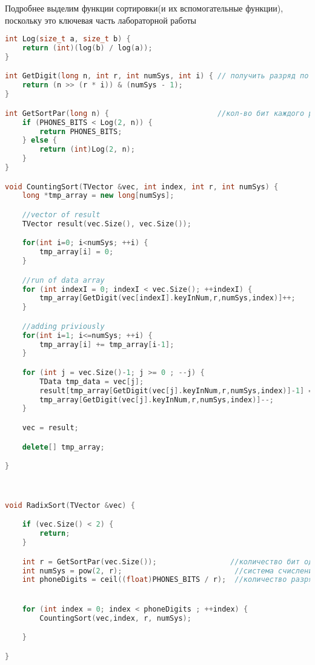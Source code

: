 Подробнее выделим функции сортировки(и их вспомогательные функции), поскольку это ключевая часть лабораторной работы
\begin{lstlisting}[language=C++]
int Log(size_t a, size_t b) {
    return (int)(log(b) / log(a));
}

int GetDigit(long n, int r, int numSys, int i) { // получить разряд по r
    return (n >> (r * i)) & (numSys - 1);
}

int GetSortPar(long n) {                         //кол-во бит каждого разряда
    if (PHONES_BITS < Log(2, n)) {
        return PHONES_BITS;
    } else {
        return (int)Log(2, n);
    }
}

void CountingSort(TVector &vec, int index, int r, int numSys) {
    long *tmp_array = new long[numSys];

    //vector of result
    TVector result(vec.Size(), vec.Size());

    for(int i=0; i<numSys; ++i) {
        tmp_array[i] = 0;
    }

    //run of data array
    for (int indexI = 0; indexI < vec.Size(); ++indexI) {
        tmp_array[GetDigit(vec[indexI].keyInNum,r,numSys,index)]++;
    }

    //adding priviously
    for(int i=1; i<=numSys; ++i) {
        tmp_array[i] += tmp_array[i-1];
    }

    for (int j = vec.Size()-1; j >= 0 ; --j) {
        TData tmp_data = vec[j];
        result[tmp_array[GetDigit(vec[j].keyInNum,r,numSys,index)]-1] = tmp_data;
        tmp_array[GetDigit(vec[j].keyInNum,r,numSys,index)]--;
    }

    vec = result;

    delete[] tmp_array;

}



void RadixSort(TVector &vec) {

    if (vec.Size() < 2) {
        return;
    }

    int r = GetSortPar(vec.Size());                 //количество бит одного разряда
    int numSys = pow(2, r);                          //система счисления
    int phoneDigits = ceil((float)PHONES_BITS / r);  //количество разрядов


    for (int index = 0; index < phoneDigits ; ++index) {
        CountingSort(vec,index, r, numSys);

    }

}

\end{lstlisting}


